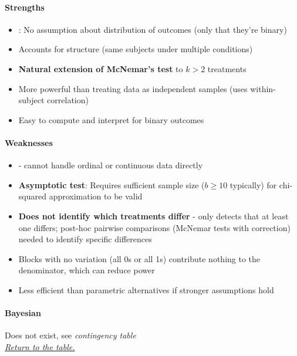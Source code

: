 \paragraph{Strengths}
\begin{itemize}
    \item {}: No assumption about distribution of outcomes (only that they're binary)
    \item Accounts for  structure (same subjects under multiple conditions)
    \item \textbf{Natural extension of McNemar's test} to $k > 2$ treatments
    \item More powerful than treating data as independent samples (uses within-subject correlation)
    \item Easy to compute and interpret for binary outcomes
\end{itemize}

\paragraph{Weaknesses}
\begin{itemize}
    \item {} - cannot handle ordinal or continuous data directly
    \item \textbf{Asymptotic test}: Requires sufficient sample size ($b \geq 10$ typically) for chi-squared
        approximation to be valid
    \item \textbf{Does not identify which treatments differ} - only detects that at least one differs;
        post-hoc pairwise comparisons (McNemar tests with correction) needed to identify specific differences
    \item Blocks with no variation (all 0s or all 1s) contribute nothing to the denominator, which can
        reduce power
    \item Less efficient than parametric alternatives if stronger assumptions hold
\end{itemize}

\paragraph{Bayesian}
Does not exist, see \emph{contingency table} \\

\textit{\hyperref[statistical_method_table]{Return to the table.}}



